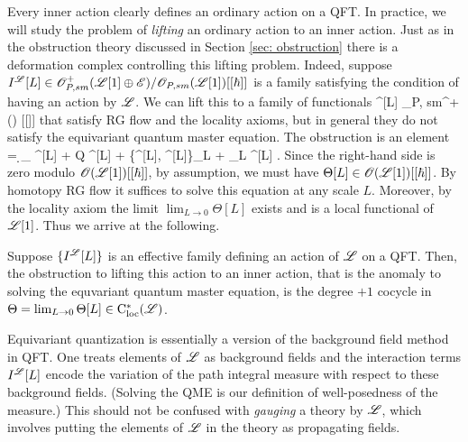 Every inner action clearly defines an ordinary action on a QFT.
In practice, we will study the problem of {\em lifting} an ordinary action to an inner action. 
Just as in the obstruction theory discussed in Section \ref{sec: obstruction} there is a deformation complex controlling this lifting problem. 
Indeed, suppose $I^{\mathscr L}[L] \in \mathscr O_{P, sm}^+(\mathscr L[1] \oplus \mathscr E) / \mathscr O_{P,sm} (\mathscr L[1]) [[\hbar]]$ is a family satisfying the condition of having an action by $\mathscr L$. 
We can lift this to a family of functionals
\ben
{}^{\sL}[L] \in \sO_{P, sm}^+(\sL[1] \oplus \sE) [[\hbar]] 
\een
that satisfy RG flow and the locality axioms, but in general they do not satisfy the equivariant quantum master equation. 
The obstruction is an element 
\ben
\Theta[L] = \d_{\sL} ^{\sL}[L] + Q ^{\sL}[L] +  \{^{\sL}[L], ^{\sL}[L]\}_L + \hbar \Delta_L ^{\sL}[L]  .
\een
Since the right-hand side is zero modulo $\mathscr O(\mathscr L[1])[[\hbar]]$, by assumption, we must have $\Theta[L] \in \mathscr O(\mathscr L[1])[[\hbar]]$. 
By homotopy RG flow it suffices to solve this equation at any scale $L$.
Moreover, by the locality axiom the limit $\lim_{L \to 0} \Theta[L]$ exists and is a local functional of $\mathscr L[1]$. 
Thus we arrive at the following.

\begin{lem}\label{lem: innner action}
Suppose $\{I^{\mathscr L}[L]\}$ is an effective family defining an action of $\mathscr L$ on a QFT.
Then, the obstruction to lifting this action to an inner action, that is the anomaly to solving the equvariant quantum master equation, is the degree $+1$ cocycle in $\Theta = \lim_{L \to 0} \Theta[L] \in {\rm C}_{\rm loc}^*(\mathscr L)$. 
\end{lem}


\begin{rmk}
Equivariant quantization is essentially a version of the background field method in QFT.
One treats elements of $\mathscr L$ as background fields and 
the interaction terms $I^\mathscr L[L]$ encode the variation of the path integral measure with respect to these background fields.
(Solving the QME is our definition of well-posedness of the measure.)
This should not be confused with {\em gauging} a theory by $\mathscr L$, which involves putting the elements of $\mathscr L$ in the theory as propagating fields.
\end{rmk}



